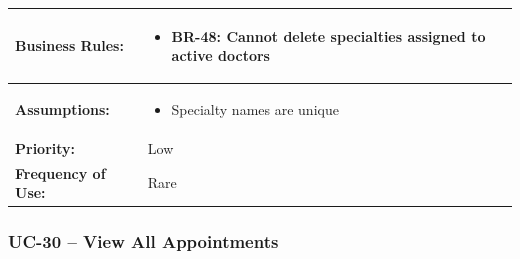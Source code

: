 \documentclass[12pt,a4paper]{article}
\begin{document}
\begin{longtable}{|p{4.5cm}|p{10.5cm}|}
\hline
\textbf{Business Rules:} &
\begin{itemize}
  \item BR-48: Cannot delete specialties assigned to active doctors
\end{itemize} \\
\hline
\textbf{Assumptions:} &
\begin{itemize}
  \item Specialty names are unique
\end{itemize} \\
\hline
\textbf{Priority:} & Low \\
\hline
\textbf{Frequency of Use:} & Rare \\
\hline
\end{longtable}

\subsubsection{UC-30 – View All Appointments}
\end{document}
